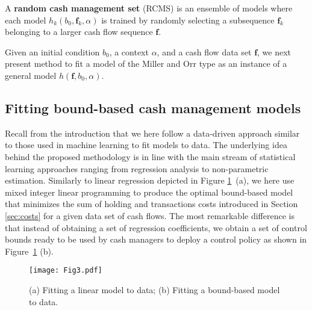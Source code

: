 \begin{definition}
A \textbf{random cash management set} (RCMS) is an ensemble of models where each model $h_k(b_0,\boldsymbol{f}_k,\alpha)$ is trained by randomly selecting a subsequence $\boldsymbol{f}_k$ belonging to a larger cash flow sequence $\boldsymbol{f}$.
\label{def:4}
\end{definition}

Given an initial condition $b_0$, a context $\alpha$, and a cash flow data set $\boldsymbol{f}$, we next present method to fit a model of the Miller and Orr type as an instance of a general model $h(\boldsymbol{f},b_0,\alpha)$.


\subsection{Fitting bound-based cash management models\label{sec:fitting}}


Recall from the introduction that we here follow a data-driven approach similar to those used in machine learning to fit models to data. The underlying idea behind the proposed methodology is in line with the main stream of statistical learning approaches ranging from regression analysis to non-parametric estimation. Similarly to linear regression depicted in Figure \ref{fig:ols}~(a), we here use mixed integer linear programming to produce the optimal bound-based model that minimizes the sum of holding and transactions costs introduced in Section \ref{sec:costs} for a given data set of cash flows. The most remarkable difference is that instead of obtaining a set of regression coefficients, we obtain a set of control bounds ready to be used by cash managers to deploy a control policy as shown in Figure~\ref{fig:ols} (b).

\begin{figure}[!htb]
\centering
\texttt{[image: Fig3.pdf]}
\caption{\label{fig:ols}(a) Fitting a linear model to data; (b) Fitting a bound-based model to data.}
\end{figure}


